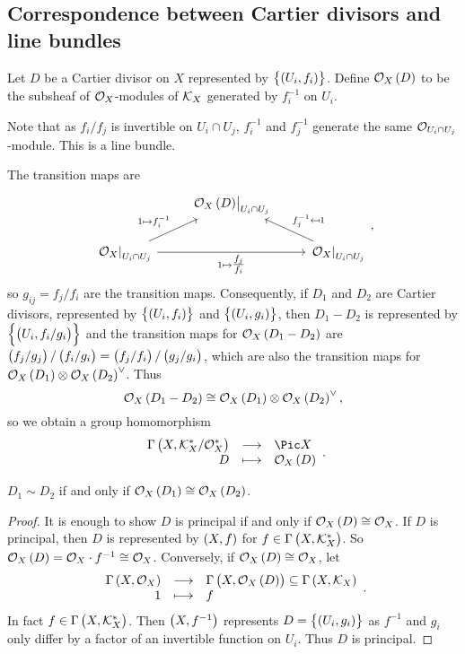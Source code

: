 \subsection{Correspondence between Cartier divisors and line bundles}

\begin{definition*}
Let $ D $ be a Cartier divisor on $ X $ represented by $ \cbr{\br{U_i, f_i}} $. Define $ \OOO_X\br{D} $ to be the subsheaf of $ \mathcal{O}_X $-modules of $ \mathcal{K}_X $ generated by $ f_i^{-1} $ on $ U_i $.
\end{definition*}

Note that as $ f_i / f_j $ is invertible on $ U_i \cap U_j $, $ f_i^{-1} $ and $ f_j^{-1} $ generate the same $ \mathcal{O}_{U_i \cap U_j} $-module. This is a line bundle.

\begin{remark*}
The transition maps are
$$
\begin{tikzcd}
& \eval{\OOO_X\br{D}}_{U_i \cap U_j} & \\
\eval{\OOO_X}_{U_i \cap U_j} \arrow{ur}{1 \mapsto f_i^{-1}} \arrow{rr}[swap]{1 \mapsto \tfrac{f_j}{f_i}} & & \eval{\OOO_X}_{U_i \cap U_j} \arrow{ul}[swap]{f_j^{-1} \mapsfrom 1}
\end{tikzcd},
$$
so $ g_{ij} = f_j / f_i $ are the transition maps. Consequently, if $ D_1 $ and $ D_2 $ are Cartier divisors, represented by $ \cbr{\br{U_i, f_i}} $ and $ \cbr{\br{U_i, g_i}} $, then $ D_1 - D_2 $ is represented by $ \cbr{\br{U_i, f_i / g_i}} $ and the transition maps for $ \OOO_X\br{D_1 - D_2} $ are $ \br{f_j / g_j} / \br{f_i / g_i} = \br{f_j / f_i} / \br{g_j / g_i} $, which are also the transition maps for $ \OOO_X\br{D_1} \otimes \OOO_X\br{D_2}^\vee $. Thus
$$ \OOO_X\br{D_1 - D_2} \cong \OOO_X\br{D_1} \otimes \OOO_X\br{D_2}^\vee, $$
so we obtain a group homomorphism
$$ \function{\Gamma\br{X, \KKK_X^* / \OOO_X^*}}{\Pic X}{D}{\OOO_X\br{D}}. $$
\end{remark*}

\begin{lemma}
$ D_1 \sim D_2 $ if and only if $ \OOO_X\br{D_1} \cong \OOO_X\br{D_2} $.
\end{lemma}

\begin{proof}
It is enough to show $ D $ is principal if and only if $ \OOO_X\br{D} \cong \OOO_X $. If $ D $ is principal, then $ D $ is represented by $ \br{X, f} $ for $ f \in \Gamma\br{X, \KKK_X^*} $. So $ \OOO_X\br{D} = \OOO_X \cdot f^{-1} \cong \OOO_X $. Conversely, if $ \OOO_X\br{D} \cong \OOO_X $, let
$$ \function{\Gamma\br{X, \OOO_X}}{\Gamma\br{X, \OOO_X\br{D}} \subseteq \Gamma\br{X, \KKK_X}}{1}{f}. $$
In fact $ f \in \Gamma\br{X, \KKK_X^*} $. Then $ \br{X, f^{-1}} $ represents $ D = \cbr{\br{U_i, g_i}} $ as $ f^{-1} $ and $ g_i $ only differ by a factor of an invertible function on $ U_i $. Thus $ D $ is principal.
\end{proof}

